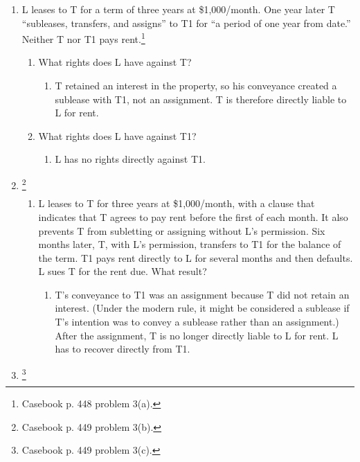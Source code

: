 \begin{enumerate}
    \item L leases to T for a term of three years at \$1,000/month. One year 
    later T ``subleases, transfers, and assigns'' to T1 for ``a period of one 
    year from date.'' Neither T nor T1 pays rent.\footnote{Casebook p. 448 
    problem 3(a).}
    \begin{enumerate}
        \item What rights does L have against T?
        \begin{enumerate}
            \item T retained an interest in the property, so his conveyance 
            created a sublease with T1, not an assignment. T is therefore 
            directly liable to L for rent.
        \end{enumerate}
        \item What rights does L have against T1?
        \begin{enumerate}
            \item L has no rights directly against T1.
        \end{enumerate}
    \end{enumerate}
    \item \footnote{Casebook p. 449 problem 3(b).}
    \begin{enumerate}
        \item L leases to T for three years at \$1,000/month, with a clause 
        that indicates that T agrees to pay rent before the first of each 
        month. It also prevents T from subletting or assigning without L's 
        permission. Six months later, T, with L's permission, transfers to T1 
        for the balance of the term. T1 pays rent directly to L for several 
        months and then defaults. L sues T for the rent due. What result?
        \begin{enumerate}
            \item T's conveyance to T1 was an assignment because T did not 
            retain an interest. (Under the modern rule, it might be considered 
            a sublease if T's intention was to convey a sublease rather than 
            an assignment.) After the assignment, T is no longer directly 
            liable to L for rent. L has to recover directly from T1.
        \end{enumerate}
    \end{enumerate}
    \item \footnote{Casebook p. 449 problem 3(c).}
    \begin{enumerate}

\end{enumerate}
\end{enumerate}

